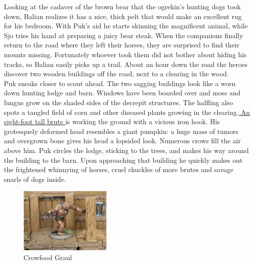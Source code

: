 Looking at the cadaver of the brown bear that the ogrekin's hunting dogs took down, Balian realizes it has a nice, thick pelt that would make an excellent rug for his bedroom. With Puk's aid he starts skinning the magnificent animal, while Sjo tries his hand at preparing a juicy bear steak. When the companions finally return to the road where they left their horses, they are surprised to find their mounts missing. Fortunately whoever took them did not bother about hiding his tracks, so Balian easily picks up a trail. About an hour down the road the heroes discover two wooden buildings off the road, next to a clearing in the wood.\\

Puk sneaks closer to scout ahead. The two sagging buildings look like a worn down hunting lodge and barn. Windows have been boarded over and moss and fungus grow on the shaded sides of the decrepit structures. The halfling also spots a tangled field of corn and other diseased plants growing in the clearing.\hyperref[fig:Crowfood-Graul-507695369]{ An eight-foot tall brute } is working the ground with a vicious iron hook. His grotesquely deformed head resembles a giant pumpkin: a huge mass of tumors and overgrown bone gives his head a lopsided look. Numerous crows fill the air above him. Puk circles the lodge, sticking to the trees, and makes his way around the building to the barn. Upon approaching that building he quickly makes out the frightened whinnying of horses, cruel chuckles of more brutes and savage snarls of dogs inside. \\

\begin{figure}[h]
	\centering
	\includegraphics[width=0.4\textwidth]{images/Crowfood-Graul-507695369_mod.jpg}
	\caption{Crowfood Graul}
	\label{fig:Crowfood-Graul-507695369}
\end{figure}

